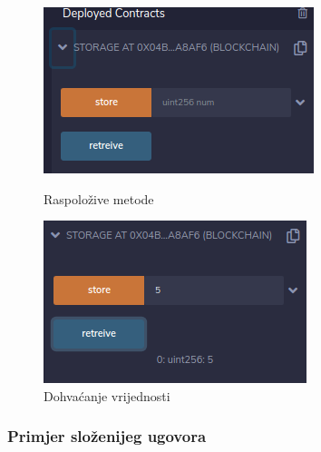 \documentclass[times, utf8, zavrsni, numeric]{fer}
\begin{document}
\begin{figure}[ht]
  \centering
  \begin{minipage}[b]{0.4\textwidth}
    \includegraphics[width=\textwidth]{remixfunctions.png}
    \caption{Raspoložive metode}
  \end{minipage}
  \hfill
  \begin{minipage}[b]{0.4\textwidth}
    \includegraphics[width=\textwidth]{number5retreived.png}
    \caption{Dohvaćanje vrijednosti}
  \end{minipage}
\end{figure}

\subsubsection{Primjer složenijeg ugovora}
\end{document}
